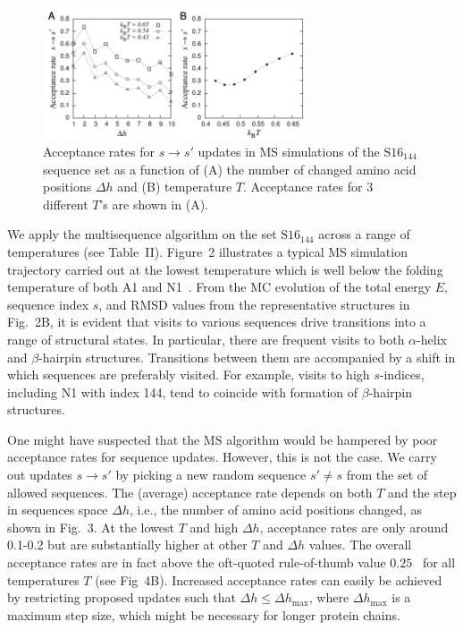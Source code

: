 \documentclass[
aip,
rsi,%
amsmath,amssymb,
reprint,%
]{revtex4-1}
\newcommand	 {\sbar}	{{s}}
\newcommand {\SR}		{${\mathrm{S16}_{144}}$}
\begin{document}
\begin{figure}
\includegraphics[width=7.8cm]{Pacc}
\caption{Acceptance rates for $\sbar\rightarrow\sbar'$ updates in MS simulations of the {\SR} sequence set as a function of (A) the number of changed amino acid positions $\Delta h$ and (B) temperature $T$. Acceptance rates for 3 different $T$'s are shown in (A).}
\end{figure}

We apply the multisequence algorithm on the set {\SR} across a range of temperatures (see Table~II). Figure~2 illustrates a typical MS simulation trajectory carried out at the lowest temperature which is well below the folding temperature of both A1 and N1~\cite{Holzgrafe2014,Holzgrafe2015}. From the MC evolution of the total energy $E$, sequence index $\sbar$, and RMSD values from the representative structures in Fig.~2B, it is evident that visits to various sequences drive transitions into a range of structural states. In particular, there are frequent visits to both $\alpha$-helix and $\beta$-hairpin structures. Transitions between them are accompanied by a shift in which sequences are preferably visited. For example, visits to high $\sbar$-indices, including N1 with index 144, tend to coincide with formation of $\beta$-hairpin structures.

One might have suspected that the MS algorithm would be hampered by poor acceptance rates for sequence updates. However, this is not the case. We carry out updates $\sbar\rightarrow\sbar'$ by picking a new random sequence $\sbar'\ne\sbar$ from the set of allowed sequences. The (average) acceptance rate  depends on both $T$ and the step in sequences space $\Delta h$, i.e., the number of amino acid positions changed, as shown in Fig.~3. At the lowest $T$ and high $\Delta h$, acceptance rates are only around 0.1-0.2 but are substantially higher at other $T$ and $\Delta h$ values. The overall acceptance rates are in fact above the oft-quoted rule-of-thumb value $0.25$~\cite{Gilks1996} for all temperatures $T$ (see Fig~4B). Increased acceptance rates can easily be achieved by restricting proposed updates such that $\Delta h\le\Delta h_\mathrm{max}$, where $\Delta h_\mathrm{max}$ is a maximum step size, which might be necessary for longer protein chains. 
\end{document}
